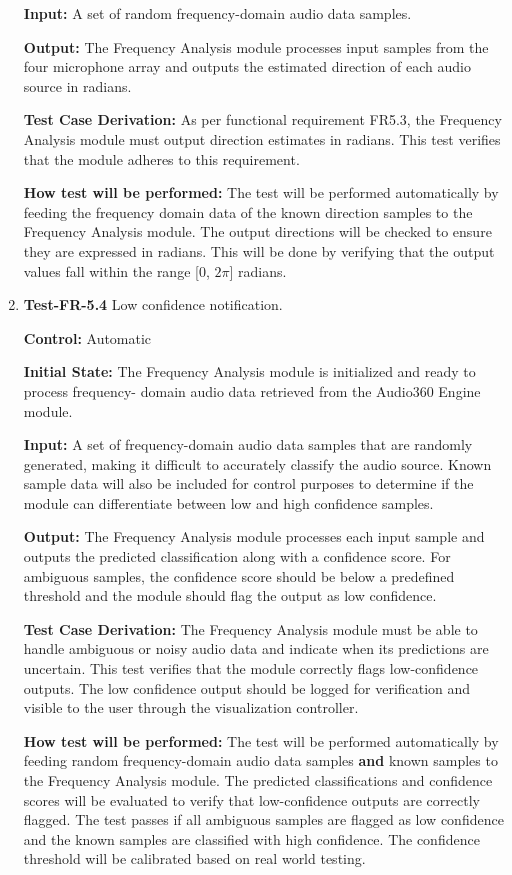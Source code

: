 \documentclass[12pt, titlepage]{article}
\begin{document}
\begin{enumerate}
\textbf{Input:}
A set of random frequency-domain audio data samples.

\textbf{Output:}
The Frequency Analysis module processes input samples from the four microphone
array and outputs the estimated direction of each audio source in radians.

\textbf{Test Case Derivation:}
As per functional requirement FR5.3, the Frequency Analysis module must output
direction estimates in radians. This test verifies that the module adheres to
this requirement.

\textbf{How test will be performed:}
The test will be performed automatically by feeding the frequency domain data of
the known direction samples to the Frequency Analysis module. The output
directions will be checked to ensure they are expressed in radians. This will be
done by verifying that the output values fall within the range [0, \(2\pi\)]
radians.

\item{\textbf{Test-FR-5.4} Low confidence notification.\\}

\textbf{Control:} Automatic

\textbf{Initial State:}
The Frequency Analysis module is initialized and ready to process frequency-
domain audio data retrieved from the Audio360 Engine module.

\textbf{Input:}
A set of frequency-domain audio data samples that are randomly generated, making
it difficult to accurately classify the audio source. Known sample data will
also be included for control purposes to determine if the module can
differentiate between low and high confidence samples.

\textbf{Output:}
The Frequency Analysis module processes each input sample and outputs the
predicted classification along with a confidence score. For ambiguous samples,
the confidence score should be below a predefined threshold and the module
should flag the output as low confidence.

\textbf{Test Case Derivation:}
The Frequency Analysis module must be able to handle ambiguous or noisy audio
data and indicate when its predictions are uncertain. This test verifies that
the module correctly flags low-confidence outputs. The low confidence output
should be logged for verification and visible to the user through the
visualization controller.

\textbf{How test will be performed:}
The test will be performed automatically by feeding random frequency-domain
audio data samples \textbf{and} known samples to the Frequency Analysis module.
The predicted classifications and confidence scores will be evaluated to verify
that low-confidence outputs are correctly flagged. The test passes if all
ambiguous samples are flagged as low confidence and the known samples are
classified with high confidence. The confidence threshold will be calibrated
based on real world testing. 

\end{enumerate}
\end{document}
